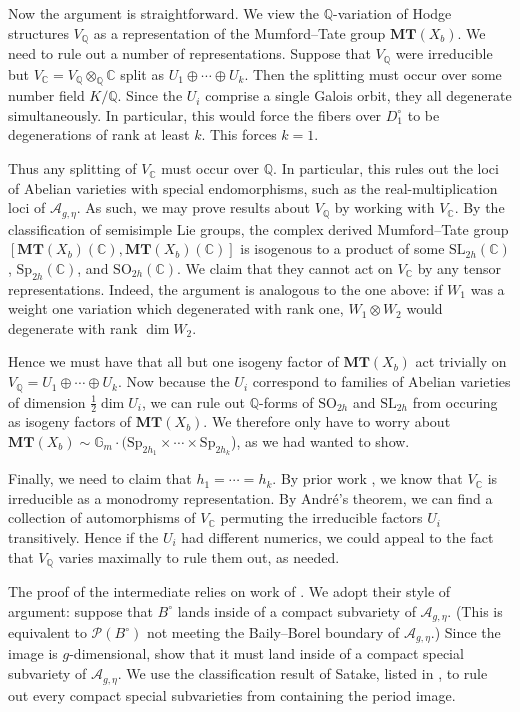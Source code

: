 \documentclass[12pt]{amsart}
\newcommand{\Q}{\mathbb{Q}}
\newcommand{\C}{\mathbb{C}}
\newcommand{\cP}{\mathcal{P}}
\newcommand{\cA}{\mathcal{A}}
\newcommand{\Sp}{\mathrm{Sp}}
\newcommand{\SL}{\mathrm{SL}}
\theoremstyle{definition}
\numberwithin{equation}{section}
\begin{document}
Now the argument is straightforward. We view the \(\Q\)-variation of Hodge structures 
\(V_\Q\) as a representation of the Mumford--Tate group \(\mathbf{MT}(X_b)\).
We need to rule out a number of representations. Suppose that \(V_\Q\) 
were irreducible but \(V_\C = V_\Q \otimes_\Q \C\) split as 
\(U_1 \oplus \cdots \oplus U_k\). Then the splitting must occur over some 
number field \(K/\Q\). Since the \(U_i\) comprise a single Galois orbit, 
they all degenerate simultaneously. In particular, this would force the fibers over 
\(D_1^\circ\) to be degenerations of rank at least \(k\). This forces \(k = 1\).

Thus any splitting of \(V_\C\) must occur over \(\Q\). In particular, this rules 
out the loci of Abelian varieties with special endomorphisms, such as 
the real-multiplication loci of \(\cA_{g, \eta}\). As such, we may prove results 
about \(V_\Q\) by working with \(V_\C\). By the classification of semisimple Lie groups, 
the complex derived Mumford--Tate group 
\([\mathbf{MT}(X_b)(\C), \mathbf{MT}(X_b)(\C)]\) is isogenous to a product of some 
\(\SL_{2h}(\C)\), \(\Sp_{2h}(\C)\), and \(\mathrm{SO}_{2h}(\C)\). We claim 
that they cannot act on \(V_\C\) by any tensor representations. Indeed, the argument 
is analogous to the one above: if \(W_1\) was a weight one variation which degenerated 
with rank one, \(W_1 \otimes W_2\) would degenerate with rank \(\dim W_2\).

Hence we must have that all but one isogeny factor of \(\mathbf{MT}(X_b)\) act 
trivially on \(V_\Q = U_1 \oplus \cdots \oplus U_k\). Now because the 
\(U_i\) correspond to families of Abelian varieties of dimension 
\(\frac{1}{2}\dim U_i\), we can rule out \(\Q\)-forms of 
\(\mathrm{SO}_{2h}\) and \(\mathrm{SL}_{2h}\) from occuring as isogeny factors 
of \(\mathbf{MT}(X_b)\). We therefore only have to worry about 
\(\mathbf{MT}(X_b) \sim \mathbb{G}_m \cdot (\Sp_{2h_1} \times \cdots \times \Sp_{2h_k}\)), 
as we had wanted to show. 

Finally, we need to claim that \(h_1 = \cdots = h_k\). By prior work \cite{varvak25}, 
we know that \(V_\C\) is irreducible as a monodromy representation. By Andr\'e's theorem, 
we can find a collection of automorphisms of \(V_\C\) permuting the irreducible factors 
\(U_i\) transitively. Hence if the \(U_i\) had different numerics, we could 
appeal to the fact that \(V_\Q\) varies maximally to rule them out, as needed.

The proof of the intermediate  relies on work of 
\cite{grushevsky-mondello-manni-tsimerman25}. We adopt their style of argument: 
suppose that \(B^\circ\) lands inside of a compact subvariety of \(\cA_{g, \eta}\). 
(This is equivalent to \(\cP(B^\circ)\) not meeting the Baily--Borel boundary 
of \(\cA_{g, \eta}\).) Since the image is \(g\)-dimensional, \cite{grushevsky-mondello-manni-tsimerman25} 
show that it must land inside of a compact special subvariety of \(\cA_{g, \eta}\). 
We use the classification result of Satake, listed in , 
to rule out every compact special subvarieties from containing the period image. 
\end{document}
